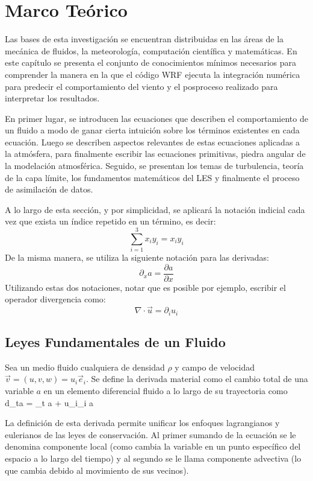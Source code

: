 \chapter{Marco Teórico}
Las bases de esta investigación se encuentran distribuidas en las áreas de la mecánica de fluidos, la meteorología, computación científica y matemáticas. En este capítulo se presenta el conjunto de conocimientos mínimos necesarios para comprender la manera en la que el código WRF ejecuta la integración numérica para predecir el comportamiento del viento y el posproceso realizado para interpretar los resultados. 

En primer lugar, se introducen las ecuaciones que describen el comportamiento de un fluido a modo de ganar cierta intuición sobre los términos existentes en cada ecuación. Luego se describen aspectos relevantes de estas ecuaciones aplicadas a la atmósfera, para finalmente escribir las ecuaciones primitivas, piedra angular de la modelación atmosférica. Seguido, se presentan los temas de turbulencia, teoría de la capa límite, los fundamentos matemáticos del LES y finalmente el proceso de asimilación de datos.

A lo largo de esta sección, y por simplicidad, se aplicará la notación indicial cada vez que exista un índice repetido en un término, es decir:
\begin{equation}\label{eq:indicial}
\sum_{i=1}^{3}\! x_i y_i = x_i y_i
\end{equation}
De la misma manera, se utiliza la siguiente notación para las derivadas:
\begin{equation}
\partial_x a = \frac{\partial a}{\partial x}
\end{equation}
Utilizando estas dos notaciones, notar que es posible por ejemplo, escribir el operador divergencia como:
\begin{equation}\label{eq:divergencia}
\nabla\cdot\vec{u} = \partial_i u_i
\end{equation}
\section{Leyes Fundamentales de un Fluido}
Sea un medio fluido cualquiera de densidad $\rho$ y campo de velocidad $\vec{v}=(u,v,w)=u_i\vec{e}_i$. Se define la derivada material como el cambio total de una variable $a$ en un elemento diferencial fluido a lo largo de su trayectoria como
\be 
d_ta = \partial_t a + u_i\partial_i a
\ee

La definición de esta derivada permite unificar los enfoques lagrangianos y eulerianos de las leyes de conservación. Al primer sumando de la ecuación se le denomina componente local (como cambia la variable en un punto específico del espacio a lo largo del tiempo) y al segundo se le llama componente advectiva (lo que cambia debido al movimiento de sus vecinos).
